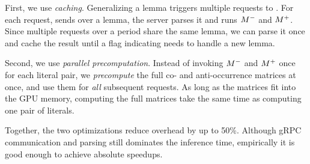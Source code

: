 
First, we use \emph{caching}. Generalizing a lemma triggers multiple requests to \tool. For each request, \dpy sends over a lemma, the server parses it and runs $M^-$ and $M^+$.
Since multiple requests over a period share the same lemma, we can parse it once and cache the result until a flag indicating \tool needs to handle a new lemma.

Second, we use \emph{parallel precomputation}. Instead of invoking $M^-$ and $M^+$ once for each literal pair, we \emph{precompute} the full co- and anti-occurrence matrices at once, and use them for \emph{all} subsequent requests.
As long as the matrices fit into the GPU memory, computing the full matrices take the same time as computing one pair of literals.

Together, the two optimizations reduce overhead by up to 50\%. Although gRPC
communication and parsing still dominates the inference time, empirically it is
good enough to achieve absolute speedups. 


